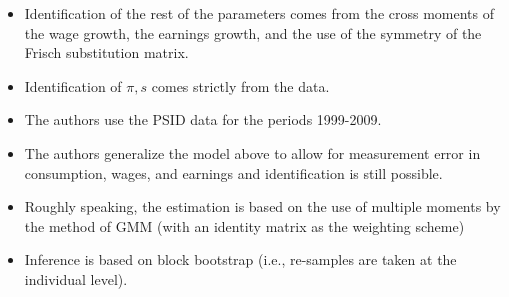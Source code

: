 \documentclass[notes=show]{beamer}
\begin{document}
\begin{frame}%


\begin{itemize}
\item Identification of the rest of the parameters comes from the cross
moments of the wage growth, the earnings growth, and the use of the symmetry
of the Frisch substitution matrix.

\item Identification of $\pi ,s$ comes strictly from the data.

\item The authors use the PSID data for the periods 1999-2009.

\item The authors generalize the model above to allow for measurement error
in consumption, wages, and earnings and identification is still possible.

\item Roughly speaking, the estimation is based on the use of multiple
moments by the method of GMM (with an identity matrix as the weighting
scheme)

\item Inference is based on block bootstrap (i.e., re-samples are taken at
the individual level).
\end{itemize}

\transboxout%
\end{frame}%

\bigskip
\end{document}
